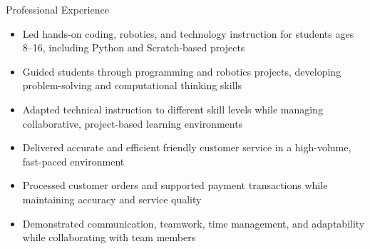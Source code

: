 \documentclass{resume}
\begin{document}
\begin{experienceSection}{Professional Experience}

    \experienceItem[
        company={Lavner Education},
        position={STEM Instructor}
        duration={May 2026 -- July 2026}
    ]
    \begin{itemize}
        \itemsep -6pt {}
        \item Led hands-on coding, robotics, and technology instruction for students ages 8--16, including Python and Scratch-based projects
        \item Guided students through programming and robotics projects, developing problem-solving and computational thinking skills
        \item Adapted technical instruction to different skill levels while managing collaborative, project-based learning environments
    \end{itemize}

    \experienceItem[
        company={Chick-Fil-A},
        position={Front of House Team Member},
        duration={February 2025 -- Present}
    ]
    \begin{itemize}
        \itemsep -6pt {}
        \item Delivered accurate and efficient friendly customer service in a high-volume, fast-paced environment
        \item Processed customer orders and supported payment transactions while maintaining accuracy and service quality
        \item Demonstrated communication, teamwork, time management, and adaptability while collaborating with team members
    \end{itemize}

\end{experienceSection}
\end{document}
